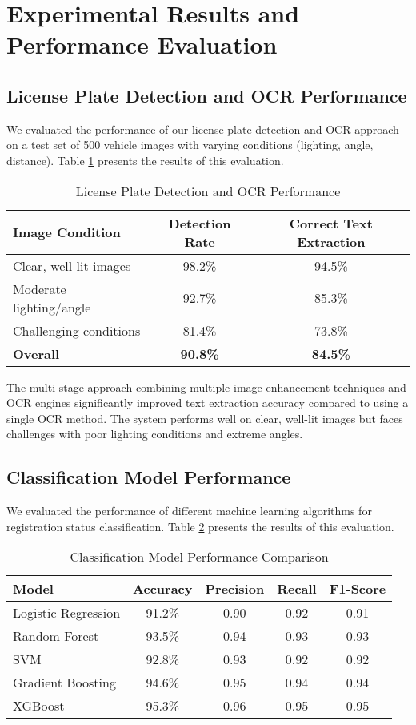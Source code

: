 \documentclass[conference]{IEEEtran}
\begin{document}
\section{Experimental Results and Performance Evaluation}

\subsection{License Plate Detection and OCR Performance}
We evaluated the performance of our license plate detection and OCR approach on a test set of 500 vehicle images with varying conditions (lighting, angle, distance). Table \ref{tab:ocr_performance} presents the results of this evaluation.

\begin{table}[h]
\caption{License Plate Detection and OCR Performance}
\label{tab:ocr_performance}
\centering
\begin{tabular}{|l|c|c|}
\hline
\textbf{Image Condition} & \textbf{Detection Rate} & \textbf{Correct Text Extraction} \\
\hline
Clear, well-lit images & 98.2\% & 94.5\% \\
\hline
Moderate lighting/angle & 92.7\% & 85.3\% \\
\hline
Challenging conditions & 81.4\% & 73.8\% \\
\hline
\textbf{Overall} & \textbf{90.8\%} & \textbf{84.5\%} \\
\hline
\end{tabular}
\end{table}

The multi-stage approach combining multiple image enhancement techniques and OCR engines significantly improved text extraction accuracy compared to using a single OCR method. The system performs well on clear, well-lit images but faces challenges with poor lighting conditions and extreme angles.

\subsection{Classification Model Performance}
We evaluated the performance of different machine learning algorithms for registration status classification. Table \ref{tab:model_performance} presents the results of this evaluation.

\begin{table}[h]
\caption{Classification Model Performance Comparison}
\label{tab:model_performance}
\centering
\begin{tabular}{|l|c|c|c|c|}
\hline
\textbf{Model} & \textbf{Accuracy} & \textbf{Precision} & \textbf{Recall} & \textbf{F1-Score} \\
\hline
Logistic Regression & 91.2\% & 0.90 & 0.92 & 0.91 \\
\hline
Random Forest & 93.5\% & 0.94 & 0.93 & 0.93 \\
\hline
SVM & 92.8\% & 0.93 & 0.92 & 0.92 \\
\hline
Gradient Boosting & 94.6\% & 0.95 & 0.94 & 0.94 \\
\hline
XGBoost & 95.3\% & 0.96 & 0.95 & 0.95 \\
\hline
\end{tabular}
\end{table}
\end{document}
